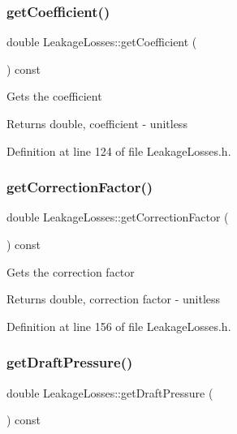 \subsubsection{\texorpdfstring{get\+Coefficient()}{getCoefficient()}}
{\footnotesize\ttfamily double Leakage\+Losses\+::get\+Coefficient (\begin{DoxyParamCaption}{ }\end{DoxyParamCaption}) const\hspace{0.3cm}{\ttfamily [inline]}}

Gets the coefficient \begin{DoxyReturn}{Returns}
double, coefficient -\/ unitless 
\end{DoxyReturn}


Definition at line 124 of file Leakage\+Losses.\+h.

\mbox{\label{class_leakage_losses_ad4f289a7490cd3fd4dfc4099fc4ad562}} 
\subsubsection{\texorpdfstring{get\+Correction\+Factor()}{getCorrectionFactor()}}
{\footnotesize\ttfamily double Leakage\+Losses\+::get\+Correction\+Factor (\begin{DoxyParamCaption}{ }\end{DoxyParamCaption}) const\hspace{0.3cm}{\ttfamily [inline]}}

Gets the correction factor \begin{DoxyReturn}{Returns}
double, correction factor -\/ unitless 
\end{DoxyReturn}


Definition at line 156 of file Leakage\+Losses.\+h.

\mbox{\label{class_leakage_losses_a0ec89fc6371c4a788e1bb861c7cfba35}} 
\subsubsection{\texorpdfstring{get\+Draft\+Pressure()}{getDraftPressure()}}
{\footnotesize\ttfamily double Leakage\+Losses\+::get\+Draft\+Pressure (\begin{DoxyParamCaption}{ }\end{DoxyParamCaption}) const\hspace{0.3cm}{\ttfamily [inline]}}

